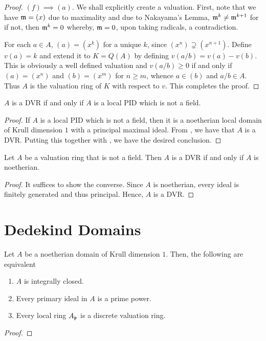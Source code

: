 \begin{proof}
    $(f)\implies(a)$. We shall explicitly create a valuation. First, note that we have $\mathfrak m = (x)$ due to maximality and due to Nakayama's Lemma, $\mathfrak m^k\ne\mathfrak m^{k + 1}$ for if not, then $\mathfrak m^k = 0$ whereby, $\mathfrak m = 0$, upon taking radicals, a contradiction. 

    For each $a\in A$, $(a) = (x^k)$ for a unique $k$, since $(x^n)\supsetneq(x^{n + 1})$. Define $v(a) = k$ and extend it to $K = Q(A)$ by defining $v(a/b) = v(a) - v(b)$. This is obviously a well defined valuation and $v(a/b)\ge 0$ if and only if $(a) = (x^n)$ and $(b) = (x^m)$ for $n\ge m$, whence $a\in (b)$ and $a/b\in A$. Thus $A$ is the valuation ring of $K$ with respect to $v$. This completes the proof.
\end{proof}

\begin{proposition}
    $A$ is a DVR if and only if $A$ is a local PID which is not a field.
\end{proposition}
\begin{proof}
    If $A$ is a local PID which is not a field, then it is a noetherian local domain of Krull dimension $1$ with a principal maximal ideal. From , we have that $A$ is a DVR. Putting this together with , we have the desired conclusion.
\end{proof}

\begin{proposition}
    Let $A$ be a valuation ring that is not a field. Then $A$ is a DVR if and only if $A$ is noetherian.
\end{proposition}
\begin{proof}
    It suffices to show the converse. Since $A$ is noetherian, every ideal is finitely generated and thus principal. Hence, $A$ is a DVR.
\end{proof}

\section{Dedekind Domains}

\begin{theorem}
    Let $A$ be a noetherian domain of Krull dimension $1$. Then, the following are equivalent 
    \begin{enumerate}[label=(\alph*)]
        \item $A$ is integrally closed.
        \item Every primary ideal in $A$ is a prime power.
        \item Every local ring $A_\mathfrak p$ is a discrete valuation ring.
    \end{enumerate}
\end{theorem}
\begin{proof}

\end{proof}


